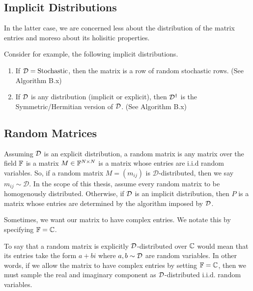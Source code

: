 
\subsection{Implicit Distributions}

In the latter case, we are concerned less about the distribution of the matrix entries and moreso about its holisitic properties.

Consider for example, the following implicit distributions.

\begin{enumerate}
\item If $\mathcal{D} = \text{Stochastic}$, then the matrix is a row of random stochastic rows. (See Algorithm B.x)
\item If $\mathcal{D}$ is any distribution (implicit or explicit), then $\mathcal{D}^{\dagger}$ is the Symmetric/Hermitian version of $\mathcal{D}$. (See Algorithm B.x)
\end{enumerate}


\subsection{Random Matrices}

\begin{definition}
Assuming $\mathcal{D}$ is an explicit distribution, a random matrix is any matrix over the field $\mathbb{F}$ is a matrix $M \in \mathbb{F}^{N \times N}$ is a matrix whose entries are i.i.d random variables. So, if a random matrix $M = (m_{ij})$ is $\mathcal{D}$-distributed, then we say $m_{ij} \sim \mathcal{D}$. In the scope of this thesis, assume every random matrix to be homogenously distributed. Otherwise, if $\mathcal{D}$ is an implicit distribution, then $P$ is a matrix whose entries are determined by the algorithm imposed by $\mathcal{D}$.
\end{definition}

Sometimes, we want our matrix to have complex entries. We notate this by specifying $\mathbb{F} = \mathbb{C}$.

\begin{remark}
To say that a random matrix is explicitly $\mathcal{D}$-distributed over $\mathbb{C}$ would mean that its entries take the form $a + bi$ where $a,b \sim \mathcal{D}$ are random variables. In other words, if we allow the matrix to have complex entries by setting $\mathbb{F} = \mathbb{C}$, then we must sample the real and imaginary component as $\mathcal{D}$-distributed i.i.d. random variables.
\end{remark}

